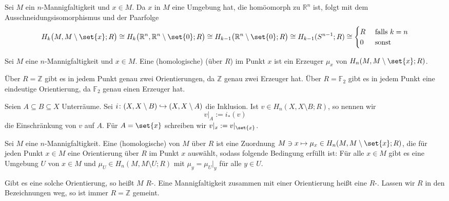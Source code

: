 \begin{bemerkung}[{name=[Homologie von Mannigfaltigkeiten]}]
	Sei $M$ ein $n$-Mannigfaltigkeit und $x \in M$. 
	Da $x$ in $M$ eine Umgebung hat, die homöomorph zu $\mathbb{R}^n$ ist, folgt mit dem Ausschneidungsisomorphismus und der Paarfolge
	\[
		H_k\enbrace[\big]{M, M\setminus \set{x};R} \cong H_k \enbrace[\big]{\mathbb{R}^n,  \mathbb{R}^n \setminus \set{0};R} \cong H_{k-1}\enbrace[\big]{\mathbb{R}^n \setminus 
		\set{0};R} \cong H_{k-1}(S^{n-1};R)\cong \begin{cases}
			R &\text{ falls }k=n\\
			0 &\text{ sonst}
		\end{cases}
	\]
\end{bemerkung}

\begin{definition}[{name=[Homologische Orientierung in einem Punkt]}]
	Sei $M$ eine $n$-Mannigfaltigkeit und $x \in M$. 
	Eine (homologische)  (über $R$) im Punkt $x$ ist ein Erzeuger $\mu_x$ von $H_n(M,M\setminus \set{x};R)$.
\end{definition}

Über $R=\mathbb{Z}$ gibt es in jedem Punkt genau zwei Orientierungen, da $\mathbb{Z}$ genau zwei Erzeuger hat. 
Über $R=\mathbb{F}_2$ gibt es in jedem Punkt eine eindeutige Orientierung, da $\mathbb{F}_2$ genau einen Erzeuger hat.

\begin{notation}[{name=[{Einschränkung eines Elementes $v\in H_n(X,X\setminus B;R)$}]}]
	Seien $A \subseteq B \subseteq X$ Unterräume. Sei $i\colon (X,X\setminus B) \hookrightarrow \enbrace*{X,X\setminus A}$ die Inklusion. 
	Ist $v\in H_n(X,X\setminus B;R)$, so nennen wir 
	\[
		v\big|_A := i_*(v)
	\]
	die Einschränkung von $v$ auf $A$. Für $A=\set{x}$ schreiben wir $v|_x := v|_{\set{x}}$.
\end{notation}

\begin{definition}[{name=[{Homologische Orientierung der gesamten Mannigfaltigkeit}]}]
	Sei $M$ eine $n$-Mannigfaltigkeit. 
	Eine (homologische)  von $M$ über $R$ ist eine Zuordnung $M \ni x \mapsto \mu_x \in H_n(M,M \setminus\set{x};R)$, die für jeden Punkt $x\in M$ eine Orientierung über $R$ im Punkt $x$ auswählt, sodass folgende Bedingung erfüllt ist:
	Für alle $x \in M$ gibt es eine Umgebung $U$ von $x \in M$ und $\mu_U \in H_n(M,M \setminus U;R)$ mit $\mu_y =\mu_U|_y$ für alle $y \in U$.

	Gibt es eine solche Orientierung, so heißt $M$ $R$-. 
	Eine Mannigfaltigkeit zusammen mit einer Orientierung heißt eine $R$-. 
	Lassen wir $R$ in den Bezeichnungen weg, so ist immer $R=\mathbb{Z}$ gemeint.
\end{definition}

